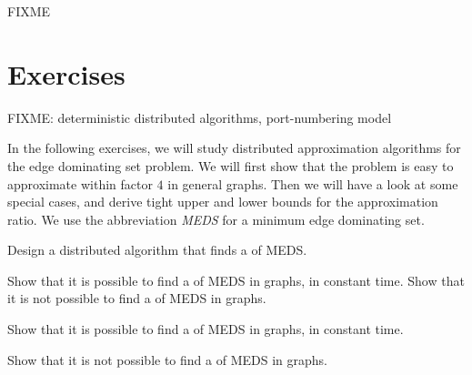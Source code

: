 
FIXME

\section{Exercises}

FIXME: deterministic distributed algorithms, port-numbering model

In the following exercises, we will study distributed approximation algorithms for the edge dominating set problem. We will first show that the problem is easy to approximate within factor $4$ in general graphs. Then we will have a look at some special cases, and derive tight upper and lower bounds for the approximation ratio. We use the abbreviation \emph{MEDS} for a minimum edge dominating set.

\begin{ex}\label{ex:edsfirst}
    Design a distributed algorithm that finds a  of MEDS.
    
\end{ex}

\begin{ex}[\Reg{2}]
    Show that it is possible to find a  of MEDS in  graphs, in constant time. Show that it is not possible to find a  of MEDS in  graphs.
\end{ex}

\begin{ex}
    Show that it is possible to find a  of MEDS in  graphs, in constant time.
    
\end{ex}

\begin{ex}
    Show that it is not possible to find a  of MEDS in  graphs.
    
\end{ex}

